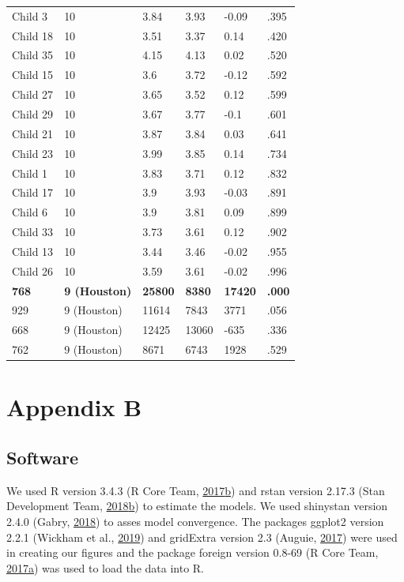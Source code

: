\documentclass[openright,titlepage,12pt,a4paper]{book}
\begin{document}
\begin{longtable}[]{@{}llllll@{}}
Child 3 & 10 & 3.84 & 3.93 & -0.09 & .395\tabularnewline
Child 18 & 10 & 3.51 & 3.37 & 0.14 & .420\tabularnewline
Child 35 & 10 & 4.15 & 4.13 & 0.02 & .520\tabularnewline
Child 15 & 10 & 3.6 & 3.72 & -0.12 & .592\tabularnewline
Child 27 & 10 & 3.65 & 3.52 & 0.12 & .599\tabularnewline
Child 29 & 10 & 3.67 & 3.77 & -0.1 & .601\tabularnewline
Child 21 & 10 & 3.87 & 3.84 & 0.03 & .641\tabularnewline
Child 23 & 10 & 3.99 & 3.85 & 0.14 & .734\tabularnewline
Child 1 & 10 & 3.83 & 3.71 & 0.12 & .832\tabularnewline
Child 17 & 10 & 3.9 & 3.93 & -0.03 & .891\tabularnewline
Child 6 & 10 & 3.9 & 3.81 & 0.09 & .899\tabularnewline
Child 33 & 10 & 3.73 & 3.61 & 0.12 & .902\tabularnewline
Child 13 & 10 & 3.44 & 3.46 & -0.02 & .955\tabularnewline
Child 26 & 10 & 3.59 & 3.61 & -0.02 & .996\tabularnewline
\textbf{768} & \textbf{9 (Houston)} & \textbf{25800} & \textbf{8380} & \textbf{17420} & \textbf{.000}\tabularnewline
929 & 9 (Houston) & 11614 & 7843 & 3771 & .056\tabularnewline
668 & 9 (Houston) & 12425 & 13060 & -635 & .336\tabularnewline
762 & 9 (Houston) & 8671 & 6743 & 1928 & .529\tabularnewline
\bottomrule
\end{longtable}

\normalsize

\newpage

\hypertarget{ch05appendixB}{%
\section*{Appendix B}\label{ch05appendixB}}

\hypertarget{software}{%
\subsection{Software}\label{software}}

We used R version 3.4.3 (R Core Team, \protect\hyperlink{ref-r_core_team_r:_2017}{2017}\protect\hyperlink{ref-r_core_team_r:_2017}{b}) and rstan version 2.17.3 (Stan Development Team, \protect\hyperlink{ref-stan_development_team_rstan:_2018}{2018}\protect\hyperlink{ref-stan_development_team_rstan:_2018}{b}) to estimate the models. We used shinystan version 2.4.0 (Gabry, \protect\hyperlink{ref-gabry_shinystan:_2018}{2018}) to asses model convergence. The packages ggplot2 version 2.2.1 (Wickham et al., \protect\hyperlink{ref-R-ggplot2}{2019}) and gridExtra version 2.3 (Auguie, \protect\hyperlink{ref-R-gridExtra}{2017}) were used in creating our figures and the package foreign version 0.8-69 (R Core Team, \protect\hyperlink{ref-r_core_team_foreign:_2017}{2017}\protect\hyperlink{ref-r_core_team_foreign:_2017}{a}) was used to load the data into R.
\end{document}
